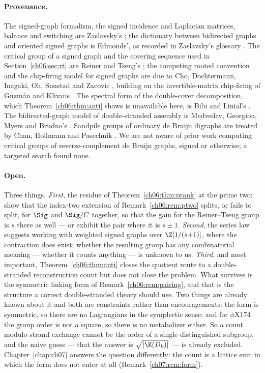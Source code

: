 \paragraph{Provenance.} The signed-graph formalism, the signed incidence and Laplacian
matrices, balance and switching are Zaslavsky's \cite{Zas82}; the dictionary between
bidirected graphs and oriented signed graphs is Edmonds', as recorded in Zaslavsky's glossary
\cite{Zas98}. The critical group of a signed graph and the covering sequence used in
Section~\ref{ch06:sec:rt} are Reiner and Tseng's \cite{RT14}; the competing rooted convention and
the chip-firing model for signed graphs are due to Cho, Dochtermann, Inagaki, Oh, Snustad and
Zacovic \cite{CDIOSZ}, building on the invertible-matrix chip-firing of Guzm\'an and Klivans
\cite{GK16}. The spectral form of the double-cover decomposition, which
Theorem~\ref{ch06:thm:anti} shows is unavailable here, is Bilu and Linial's \cite{BL06}. The
bidirected-graph model of double-stranded assembly is Medvedev, Georgiou, Myers and Brudno's
\cite{MGMB07}. Sandpile groups of ordinary de Bruijn digraphs are treated by Chan, Hollmann
and Pasechnik \cite{CHP}. We are not aware of prior work computing critical groups of
reverse-complement de Bruijn graphs, signed or otherwise; a targeted search found none.

\paragraph{Open.} Three things.
\emph{First}, the residue of Theorem~\ref{ch06:thm:prank} at the prime two: show that the
index-two extension of Remark~\ref{ch06:rem:ptwo} splits, or fails to split, for $\Sig$ and
$\Sig/C$ together, so that the gain for the Reiner--Tseng group is $s$ there as well --- or
exhibit the pair where it is $s\pm1$.
\emph{Second}, the series law suggests working with weighted signed graphs over
$\Z[1/(s{+}1)]$, where the contraction does exist; whether the resulting group has any
combinatorial meaning --- whether it counts anything --- is unknown to us.
\emph{Third}, and most important, Theorem~\ref{ch06:thm:anti} closes the quotient route to a
double-stranded reconstruction count but does not close the problem. What survives is the
symmetric linking form of Remark~\ref{ch06:rem:pairing}, and that is the structure a correct
double-stranded theory should use. Two things are already known about it and both are
constraints rather than encouragements: the form is symmetric, so there are no Lagrangians
in the symplectic sense; and for $\phi$X174 the group order is not a square, so there is no
metabolizer either. So a count modulo strand exchange cannot be the order of a single
distinguished subgroup, and the naive guess --- that the answer is $\sqrt{|\K(D_k)|}$ --- is
already excluded. Chapter~\ref{chap:ch07} answers the question differently: the count is a
lattice sum in which the form does not enter at all (Remark~\ref{ch07:rem:form}).
